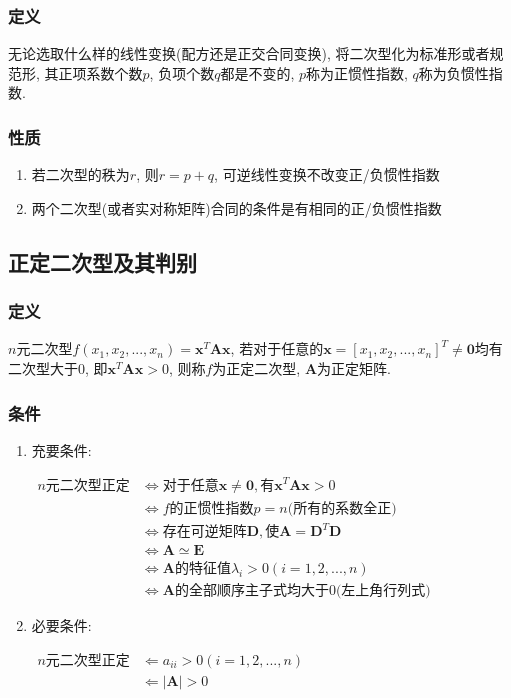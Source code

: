 \subsubsection{定义}
无论选取什么样的线性变换(配方还是正交合同变换), 将二次型化为标准形或者规范形, 其正项系数个数$ p $, 负项个数$ q $都是不变的, $ p $称为正惯性指数, $ q $称为负惯性指数.
\subsubsection{性质}
\begin{enumerate}
\item 若二次型的秩为$ r $, 则$ r=p+q $, 可逆线性变换不改变正/负惯性指数
\item 两个二次型(或者实对称矩阵)合同的条件是有相同的正/负惯性指数
\end{enumerate}
\subsection{正定二次型及其判别}
\subsubsection{定义}
$ n $元二次型$ f(x_{1}, x_{2},... ,x_{n})=\bm{x}^{T}\bm{A}\bm{x} $, 若对于任意的$ \bm{x}=[x_{1},x_{2},... ,x_{n}]^{T}\neq \bm{0} $均有二次型大于0, 即$ \bm{x}^{T}\bm{A}\bm{x}>0 $, 则称$ f $为正定二次型, $ \bm{A} $为正定矩阵.
\subsubsection{条件}
\begin{enumerate}
\item 充要条件: \par $ \begin{aligned}
n\text{元二次型正定} & \Leftrightarrow \text{对于任意}\bm{x}\neq \bm{0}, \text{有}\bm{x}^{T}\bm{A}\bm{x}>0 \\
& \Leftrightarrow f\text{的正惯性指数} p=n\text{(所有的系数全正)} \\
& \Leftrightarrow \text{存在可逆矩阵} \bm{D}, \text{使} \bm{A}=\bm{D}^{T}\bm{D} \\
& \Leftrightarrow \bm{A}\simeq \bm{E} \\
& \Leftrightarrow \bm{A}\text{的特征值} \lambda_{i}>0(i=1, 2,... ,n) \\
& \Leftrightarrow \bm{A}\text{的全部顺序主子式均大于0(左上角行列式)}
\end{aligned} $
\item 必要条件: \par $ \begin{aligned}
n\text{元二次型正定} & \Leftarrow a_{ii}>0(i=1, 2,... ,n) \\
& \Leftarrow \left|\bm{A}\right|>0 
\end{aligned} $
\end{enumerate}
